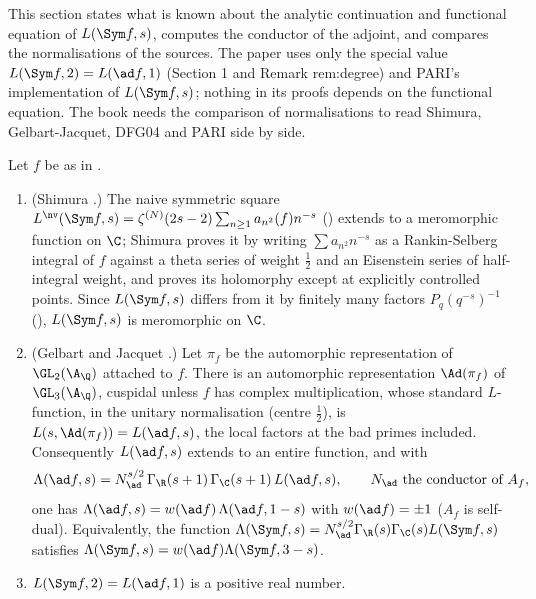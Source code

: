 This section states what is known about the analytic continuation and functional equation of $L(\Sym f,s)$, computes the conductor of the adjoint, and
compares the normalisations of the sources. The paper uses only the special value $L(\Sym f,2)=L(\ad f,1)$ (Section 1 and Remark rem:degree) and PARI's
implementation of $L(\Sym f,s)$; nothing in its proofs depends on the functional equation. The book needs the comparison of normalisations to read Shimura,
Gelbart-Jacquet, DFG04 and PARI side by side.

\begin{theorem}\label{thm:lfunctions:sym2-analytic}
Let $f$ be as in .
\begin{enumerate}[label=(\roman*)]
\item (Shimura \cite{Shimura75}.) The naive symmetric square $L^{\nv}(\Sym f,s)=\zeta^{(N)}(2s-2)\sum_{n\ge1}a_{n^2}(f)n^{-s}$ () extends to a
meromorphic function on $\C$; Shimura proves it by writing $\sum a_{n^2}n^{-s}$ as a Rankin-Selberg integral of $f$ against a theta series of weight $\frac12$ and an
Eisenstein series of half-integral weight, and proves its holomorphy except at explicitly controlled points. Since $L(\Sym f,s)$ differs from it by finitely
many factors $P_q(q^{-s})^{-1}$ (), $L(\Sym f,s)$ is meromorphic on $\C$.
\item (Gelbart and Jacquet \cite{GelbartJacquet}.) Let $\pi_f$ be the automorphic representation of $\GL_2(\A_\Q)$ attached to $f$. There is an automorphic
representation $\Ad(\pi_f)$ of $\GL_3(\A_\Q)$, cuspidal unless $f$ has complex multiplication, whose standard $L$-function, in the unitary normalisation (centre
$\frac12$), is $L(s,\Ad(\pi_f))=L(\ad f,s)$, the local factors at the bad primes included. Consequently $L(\ad f,s)$ extends to an entire function, and with
\[
\Lambda(\ad f,s)=N_{\ad}^{s/2}\,\Gamma_\R(s+1)\,\Gamma_\C(s+1)\,L(\ad f,s),\qquad N_{\ad}\text{ the conductor of }A_f,
\]
one has $\Lambda(\ad f,s)=w(\ad f)\,\Lambda(\ad f,1-s)$ with $w(\ad f)=\pm1$ ($A_f$ is self-dual). Equivalently, the function
$\Lambda(\Sym f,s)=N_{\ad}^{s/2}\Gamma_\R(s)\Gamma_\C(s)L(\Sym f,s)$ satisfies $\Lambda(\Sym f,s)=w(\ad f)\Lambda(\Sym f,3-s)$.
\item $L(\Sym f,2)=L(\ad f,1)$ is a positive real number.
\end{enumerate}
\end{theorem}

